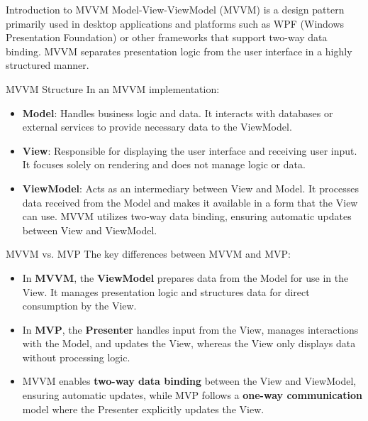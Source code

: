 \documentclass[aspectratio=169, table]{beamer}
\begin{document}
\begin{frame}[fragile]{Introduction to MVVM}
	\vspace{20pt}
	Model-View-ViewModel (MVVM) is a design pattern primarily used in desktop applications and platforms such as WPF (Windows Presentation Foundation) or other frameworks that support two-way data binding. MVVM separates presentation logic from the user interface in a highly structured manner.
\end{frame}

\begin{frame}[fragile]{MVVM Structure}
	\vspace{20pt}
	In an MVVM implementation:
	\begin{itemize}
		\item \textbf{Model}: Handles business logic and data. It interacts with databases or external services to provide necessary data to the ViewModel.
		\item \textbf{View}: Responsible for displaying the user interface and receiving user input. It focuses solely on rendering and does not manage logic or data.
		\item \textbf{ViewModel}: Acts as an intermediary between View and Model. It processes data received from the Model and makes it available in a form that the View can use. MVVM utilizes two-way data binding, ensuring automatic updates between View and ViewModel.
	\end{itemize}
\end{frame}

\begin{frame}[fragile]{MVVM vs. MVP}
	\vspace{20pt}
	The key differences between MVVM and MVP:
	\begin{itemize}
		\item In \textbf{MVVM}, the \textbf{ViewModel} prepares data from the Model for use in the View. It manages presentation logic and structures data for direct consumption by the View.
		\item In \textbf{MVP}, the \textbf{Presenter} handles input from the View, manages interactions with the Model, and updates the View, whereas the View only displays data without processing logic.
		\item MVVM enables \textbf{two-way data binding} between the View and ViewModel, ensuring automatic updates, while MVP follows a \textbf{one-way communication} model where the Presenter explicitly updates the View.
	\end{itemize}
\end{frame}
\end{document}
